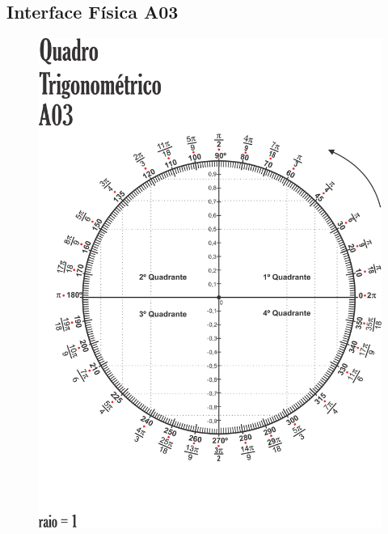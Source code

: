 \subsection{Interface Física A03}\label{subsection:atividade3_A03}
\begin{figure}[htb]
	\centering
	\includegraphics[width=0.9\linewidth]{chapters/appendixLesson/Interface_A03.png}
\end{figure}
\clearpage

